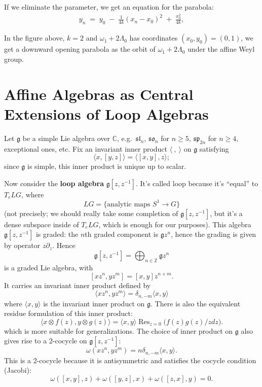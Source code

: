 \documentclass[12pt]{article}
\begin{document}
If we eliminate the parameter, we get an equation for the parabola:
\begin{align*}
    y_n \;=\; y_0 \;-\;\frac{1}{4k}(x_n - x_0)^2 \;+\; \frac{x_0^2}{4k},
\end{align*}

In the figure above, $k=2$ and $\omega_1 + 2\Lambda_0$ has coordinates $(x_0,y_0) = (0,1)$, we get a downward opening parabola as the orbit of $\omega_1 + 2\Lambda_0$ under the affine Weyl group.


\section{Affine Algebras as Central Extensions of Loop Algebras}
Let $\mathfrak{g}$ be a simple Lie algebra over $\mathbb{C}$, e.g.\ $\mathfrak{sl}_n$, $\mathfrak{so}_n$ for $n \geq 5$, $\mathfrak{sp}_{2n}$ for $n \geq 4$, exceptional ones, etc. Fix an invariant inner product $\langle\ ,\ \rangle$ on $\mathfrak{g}$ satisfying
\[
    \langle x, [y,z]\rangle = \langle [x,y], z\rangle;
\]
since $\mathfrak{g}$ is simple, this inner product is unique up to scalar.

Now consider the \textbf{loop algebra} $\mathfrak{g}[z,z^{-1}]$. It's called loop because it's “equal” to $T_e LG$, where
\[
    LG = \{\text{analytic maps } S^1 \to G\}
\]
(not precisely; we should really take some completion of $\mathfrak{g}[z,z^{-1}]$, but it's a dense subspace inside of $T_e LG$, which is enough for our purposes). This algebra $\mathfrak{g}[z,z^{-1}]$ is graded: the $n$th graded component is $\mathfrak{g} z^n$, hence the grading is given by operator $z\partial_z$. Hence
\[
    \mathfrak{g}[z,z^{-1}] = \bigoplus_{n \in \mathbb{Z}} \mathfrak{g}z^n
\]
is a graded Lie algebra, with
\[
    [xz^n, yz^m] = [x,y] z^{n+m}.
\]
It carries an invariant inner product defined by
\[
    \langle xz^n, yz^m \rangle = \delta_{n,-m} \langle x,y \rangle
\] where $\langle x,y \rangle$ is the invariant inner product on $\mathfrak{g}$. There is also the equivalent residue formulation of this inner product:
\[
    \langle x\otimes f(z), y\otimes g(z) \rangle = \langle x,y \rangle \operatorname{Res}_{z=0}\bigg(f(z)g(z)/z dz\bigg).
\] which is more suitable for generalizations. The choice of inner product on $\mathfrak{g}$ also gives rise to a 2-cocycle on $\mathfrak{g}[z,z^{-1}]$:
\[
    \omega(xz^n, yz^m) = n \delta_{n,-m} \langle x,y \rangle.
\]
This is a 2-cocycle because it is antisymmetric and satisfies the cocycle condition (Jacobi):
\[
    \omega([x,y],z) + \omega([y,z],x) + \omega([z,x],y) = 0.
\]
\end{document}
